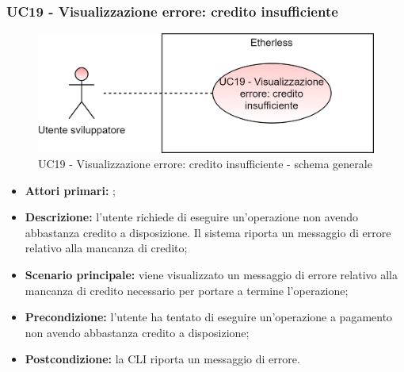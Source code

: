 \subsubsection{UC19 - Visualizzazione errore: credito insufficiente}
\begin{figure}[H]
	\centering
	\includegraphics[scale=\ucs]{./res/img/UC19G.png}
	\caption {UC19 - Visualizzazione errore: credito insufficiente - schema generale}
\end{figure}
\begin{itemize}
	\item \textbf{Attori primari:} \us{};
	\item \textbf{Descrizione:} l’utente richiede di eseguire un’operazione non avendo abbastanza credito a disposizione. Il sistema riporta un messaggio di errore relativo alla mancanza di credito; 
	\item \textbf{Scenario principale:} viene visualizzato un messaggio di errore relativo alla mancanza di credito necessario per portare a termine l’operazione;
	\item \textbf{Precondizione:} l’utente ha tentato di eseguire un’operazione a pagamento non avendo abbastanza credito a disposizione;  
	\item \textbf{Postcondizione:} la CLI riporta un messaggio di errore. 
\end{itemize}